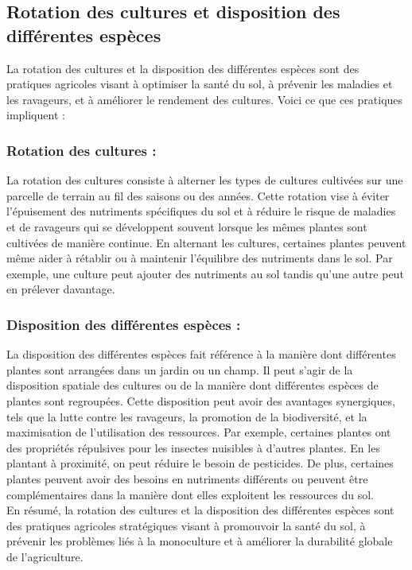 \subsection{Rotation des cultures et disposition des différentes espèces}
La rotation des cultures et la disposition des différentes espèces sont des pratiques agricoles visant à optimiser la santé du sol, à prévenir les maladies et les ravageurs, et à améliorer le rendement des cultures. Voici ce que ces pratiques impliquent :
\subsubsection{Rotation des cultures : } La rotation des cultures consiste à alterner les types de cultures cultivées sur une parcelle de terrain au fil des saisons ou des années. Cette rotation vise à éviter l'épuisement des nutriments spécifiques du sol et à réduire le risque de maladies et de ravageurs qui se développent souvent lorsque les mêmes plantes sont cultivées de manière continue. En alternant les cultures, certaines plantes peuvent même aider à rétablir ou à maintenir l'équilibre des nutriments dans le sol. Par exemple, une culture peut ajouter des nutriments au sol tandis qu'une autre peut en prélever davantage.
\subsubsection{ Disposition des différentes espèces : }La disposition des différentes espèces fait référence à la manière dont différentes plantes sont arrangées dans un jardin ou un champ. Il peut s'agir de la disposition spatiale des cultures ou de la manière dont différentes espèces de plantes sont regroupées. Cette disposition peut avoir des avantages synergiques, tels que la lutte contre les ravageurs, la promotion de la biodiversité, et la maximisation de l'utilisation des ressources.
Par exemple, certaines plantes ont des propriétés répulsives pour les insectes nuisibles à d'autres plantes. En les plantant à proximité, on peut réduire le besoin de pesticides. De plus, certaines plantes peuvent avoir des besoins en nutriments différents ou peuvent être complémentaires dans la manière dont elles exploitent les ressources du sol.\\
En résumé, la rotation des cultures et la disposition des différentes espèces sont des pratiques agricoles stratégiques visant à promouvoir la santé du sol, à prévenir les problèmes liés à la monoculture et à améliorer la durabilité globale de l'agriculture.
